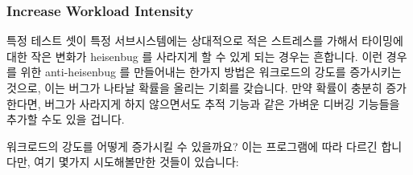 \subsubsection{Increase Workload Intensity}
\label{sec:debugging:Increase Workload Intensity}

특정 테스트 셋이 특정 서브시스템에는 상대적으로 적은 스트레스를 가해서 타이밍에
대한 작은 변화가 heisenbug 를 사라지게 할 수 있게 되는 경우는 흔합니다.
이런 경우를 위한 anti-heisenbug 를 만들어내는 한가지 방법은 워크로드의 강도를
증가시키는 것으로, 이는 버그가 나타날 확률을 올리는 기회를 갖습니다.
만약 확률이 충분히 증가한다면, 버그가 사라지게 하지 않으면서도 추적 기능과 같은
가벼운 디버깅 기능들을 추가할 수도 있을 겁니다.

워크로드의 강도를 어떻게 증가시킬 수 있을까요?
이는 프로그램에 따라 다르긴 합니다만, 여기 몇가지 시도해볼만한 것들이 있습니다:

